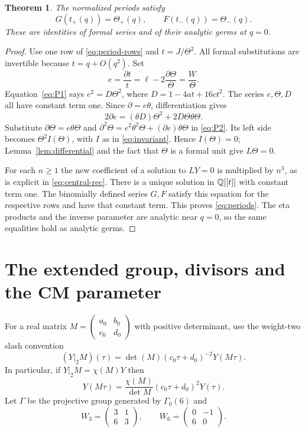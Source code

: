 \documentclass[11pt,a4paper]{article}
\newtheorem{theorem}{Theorem}[section]
\theoremstyle{remark}\newtheorem{remark}[theorem]{Remark}
\newcommand{\dd}{\partial}\newcommand{\Tp}{\mathcal T_p}
\newcommand{\smat}[4]{\begin{pmatrix}#1&#2\\#3&#4\end{pmatrix}}
\begin{document}
\begin{theorem}\label{thm:periods}
The normalized periods satisfy
\begin{equation}\label{eq:periods}
 G(t_+(q))=\Theta_+(q),\qquad F(t_-(q))=\Theta_-(q).
\end{equation}
These are identities of formal series and of their analytic germs at $q=0$.
\end{theorem}
\begin{proof}
Use one row of \eqref{eq:period-rows} and $t=J/\Theta^2$.
All formal substitutions are invertible because $t=q+O(q^2)$.
Set
\[
 e=\frac{\dd t}{t}=\ell-2\frac{\dd\Theta}{\Theta}=\frac W\Theta.
\]
Equation~\eqref{eq:P1} says $e^2=D\Theta^2$, where
$D=1-4at+16ct^2$. The series $e,\Theta,D$ all have constant term one.
Since $\dd=e\theta$, differentiation gives
\[
 2\dd e=(\theta D)\Theta^2+2D\Theta\theta\Theta.
\]
Substitute $\dd\Theta=e\theta\Theta$ and
$\dd^2\Theta=e^2\theta^2\Theta+(\dd e)\theta\Theta$ in
\eqref{eq:P2}. Its left side becomes $\Theta^2I(\Theta)$,
with $I$ as in \eqref{eq:invariant}. Hence $I(\Theta)=0$;
Lemma~\ref{lem:differential} and the fact that $\Theta$ is a formal unit
give $L\Theta=0$.

For each $n\ge1$ the new coefficient of a solution to $LY=0$ is
multiplied by $n^3$, as is explicit in \eqref{eq:central-rec}.
There is a unique solution in $\mathbb Q[[t]]$ with constant term one.
The binomially defined series $G,F$ satisfy this equation for the respective
rows and have that constant term. This proves \eqref{eq:periods}.
The eta products and the inverse parameter are analytic near $q=0$, so the
same equalities hold as analytic germs.
\end{proof}

\section{The extended group, divisors and the CM parameter}
\label{sec:geometry}
For a real matrix $M=\smat{a_0}{b_0}{c_0}{d_0}$ with positive determinant,
use the weight-two slash convention
\begin{equation}\label{eq:slash}
 (Y|_2M)(\tau)=\det(M)(c_0\tau+d_0)^{-2}Y(M\tau).
\end{equation}
In particular, if $Y|_2M=\chi(M)Y$ then
\begin{equation}\label{eq:transform}
 Y(M\tau)=\frac{\chi(M)}{\det M}(c_0\tau+d_0)^2Y(\tau).
\end{equation}
Let $\Gamma$ be the projective group generated by $\Gamma_0(6)$ and
\begin{equation}\label{eq:Ws}
 W_3=\smat3163,\qquad W_6=\smat0{-1}60.
\end{equation}
\end{document}
